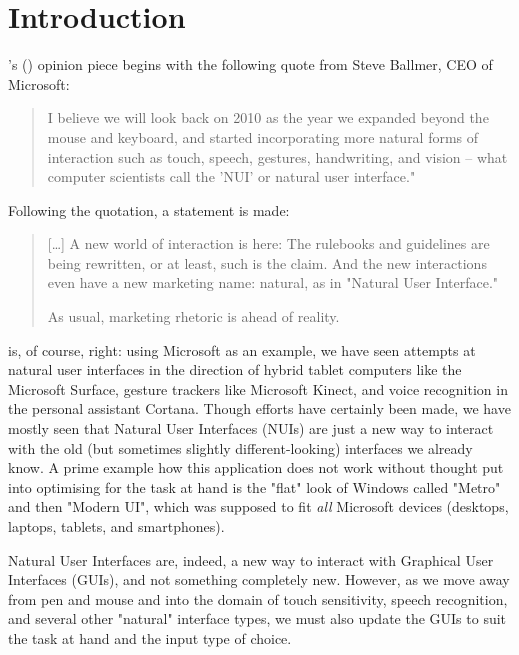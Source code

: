 \section{Introduction}

\citeauthor{norman:natural-user-interfaces-are-not-natural:2010}'s (\citeyear{norman:natural-user-interfaces-are-not-natural:2010}) opinion piece  begins with the following quote from Steve Ballmer, CEO of Microsoft:

\begin{quote}
I believe we will look back on 2010 as the year we expanded beyond the mouse and keyboard, and started incorporating more natural forms of interaction such as touch, speech, gestures, handwriting, and vision -- what computer scientists call the 'NUI' or natural user interface."
\end{quote}


Following the quotation, a statement is made:

\begin{quotation}
[\dots] A new world of interaction is here: The rulebooks and guidelines are being rewritten, or at least, such is the claim. And the new interactions even have a new marketing name: natural, as in "Natural User Interface."

As usual, marketing rhetoric is ahead of reality.    
\end{quotation}

\citeauthor{norman:natural-user-interfaces-are-not-natural:2010} is, of course, right: using Microsoft as an example, we have seen attempts at natural user interfaces in the direction of hybrid tablet computers like the Microsoft Surface, gesture trackers like Microsoft Kinect, and voice recognition in the personal assistant Cortana. Though efforts have certainly been made, we have mostly seen that Natural User Interfaces (NUIs) are just a new way to interact with the old (but sometimes slightly different-looking) interfaces we already know. A prime example how this application does not work without thought put into optimising for the task at hand is the "flat" look of Windows called "Metro" and then "Modern UI", which was supposed to fit \textit{all} Microsoft devices (desktops, laptops, tablets, and smartphones).

Natural User Interfaces are, indeed, a new way to interact with Graphical User Interfaces (GUIs), and not something completely new. However, as we move away from pen and mouse and into the domain of touch sensitivity, speech recognition, and several other "natural" interface types, we must also update the GUIs to suit the task at hand and the input type of choice.

